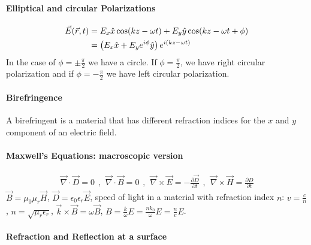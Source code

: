\paragraph{Elliptical and circular Polarizations}
\begin{align*}
    \vec{E}(\vec{r},t) &= E_x \hat{x} \cos(k z - \omega t) + E_y \hat{y} \cos(k z - \omega t + \phi)
    \\
    &= \left( E_x \hat{x} + E_y e^{i \phi} \hat{y} \right) e^{i (k z - \omega t)}
\end{align*}
In the case of $\phi = \pm \frac{\pi}{2}$ we have a circle. If $\phi = \frac{\pi}{2}$,
we have right circular polarization and if $\phi = - \frac{\pi}{2}$ we have left
circular polarization.

\paragraph{Birefringence}
A birefringent is a material that has different refraction indices for the $x$ and
$y$ component of an electric field.

\paragraph{Maxwell's Equations: macroscopic version}
\begin{align*}
    \vec{\nabla} \cdot \vec{D} = 0
    \hspace{5pt} , \hspace{5pt}
    \vec{\nabla} \cdot \vec{B} = 0
    \hspace{5pt} , \hspace{5pt}
    \vec{\nabla} \times \vec{E} = - \frac{\partial \vec{D}}{\partial t}
    \hspace{5pt} , \hspace{5pt}
    \vec{\nabla} \times \vec{H} = \frac{\partial D}{\partial t}
\end{align*}
$\vec{B} = \mu_0 \mu_r \vec{H}$, $\vec{D} = \epsilon_0 \epsilon_r \vec{E}$,
speed of light in a material with refraction index $n$: $v = \frac{c}{n}$,
$n = \sqrt{\mu_r \epsilon_r}$, $\vec{k} \times \vec{B} = \omega \vec{B}$,
$B = \frac{k}{\omega} E = \frac{n k_0}{\omega} E = \frac{n}{c} E$.

\paragraph{Refraction and Reflection at a surface}

